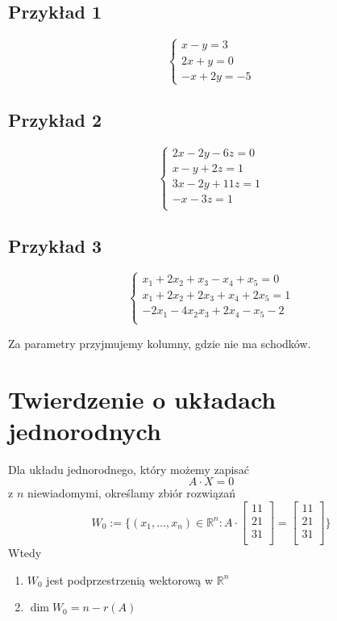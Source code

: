 \documentclass[11pt]{article}
\begin{document}
\subsection{Przykład 1}
$$ \begin{cases}
x- y = 3 \\
2x+y = 0 \\
-x + 2y = -5 
\end{cases} $$
\subsection{Przykład 2}
$$ \begin{cases}
2x -2y - 6z = 0 \\
x - y + 2z = 1 \\
3x - 2y + 11z = 1 \\
-x -3z = 1 \\
\end{cases}$$
\subsection{Przykład 3}
$$ \begin{cases}
x_1 + 2x_2 + x_3 - x_4 + x_5 = 0 \\
x_1 + 2x_2  +2 x_3 + x_4 + 2x_5 = 1 \\
-2x_1 - 4x_2 x_3 + 2x_4 - x_5 - 2 \\
\end{cases}
$$

Za parametry przyjmujemy kolumny, gdzie nie ma schodków. 

\section{Twierdzenie o układach jednorodnych}
Dla układu jednorodnego, który możemy zapisać $$ A \cdot X = 0$$ z $n$ niewiadomymi, określamy zbiór rozwiązań $$W_{0} := \{ (x_1,\ldots,x_n) \in \mathbb{R}^n : A \cdot \begin{bmatrix}
	11\\
	21\\
	31\\
\end{bmatrix} = \begin{bmatrix}
	11\\
	21\\
	31\\
\end{bmatrix} \}$$
Wtedy 
\begin{enumerate}
\item{$W_0$ jest podprzestrzenią wektorową w $\mathbb{R}^n$}
\item{$\dim{W_0} = n - r(A)$}
\end{enumerate}
\end{document}
